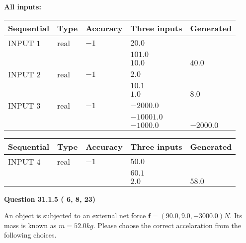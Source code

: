 \documentclass[12pt]{article}
\begin{document}
   
   
   
\noindent\vspace{0.1in}\hspace{-0.08in} {\textbf{\Large{All inputs: }}}
   
   
  
  
\noindent\begin{tabular}{|l|l|l|l|l|}
\hline
 Sequential & Type & Accuracy & Three inputs & Generated \\ 
\hline
 
 
  INPUT $           1$ & real & $          -1 $ & $
 20.0
  $ & \\
  & & &  $
 101.0
  $ & \\
  & & &  $
 10.0
 $ & $ 40.0 $ 
 \\  \hline  
 
 
  INPUT $           2$ & real & $          -1 $ & $
 2.0
  $ & \\
  & & &  $
 10.1
  $ & \\
  & & &  $
 1.0
 $ & $ 8.0 $ 
 \\  \hline  
 
 
  INPUT $           3$ & real & $          -1 $ & $
 -2000.0
  $ & \\
  & & &  $
 -10001.0
  $ & \\
  & & &  $
 -1000.0
 $ & $ -2000.0 $ 
 \\  \hline  
 \end{tabular}
   
   
  
  
\noindent\begin{tabular}{|l|l|l|l|l|}
\hline
 Sequential & Type & Accuracy & Three inputs & Generated \\ 
\hline
 
 
  INPUT $           4$ & real & $          -1 $ & $
 50.0
  $ & \\
  & & &  $
 60.1
  $ & \\
  & & &  $
 2.0
 $ & $ 58.0 $ 
 \\  \hline  
 \end{tabular}
   
   
  
\vspace{0.2in}
  
{\textbf{\Large{Question
31.1.5 
 (          6,          8,         23)
}}}
  
  
 
An object is subjected to an external net force $\mathbf{f}=(
90.0 ,
9.0,
-3000.0  )N$. Its mass is known as
$m= %
52.0  kg$. Please choose the correct accelaration
from the following choices.
 
\end{document}
